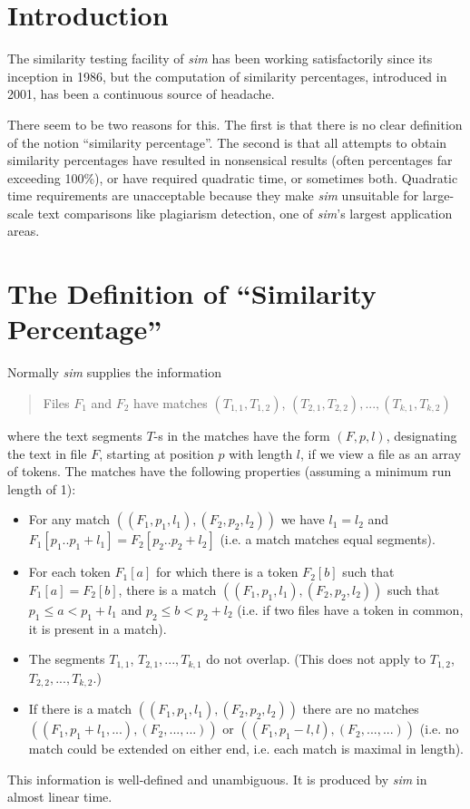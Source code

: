 \documentclass[a4paper,fleqn]{article}
\renewcommand{\sim}[0]{{\it sim}}
\begin{document}
\maketitle

\section{Introduction}

The similarity testing facility of {\sim} has been working satisfactorily
since its inception in 1986, but the computation of similarity percentages,
introduced in 2001, has been a continuous source of headache.

There seem to be two reasons for this. The first is that there is no clear
definition of the notion ``similarity percentage''.
The second is that all
attempts to obtain similarity percentages have resulted in nonsensical results
(often percentages far exceeding 100\%), or have required quadratic time, or
sometimes both. Quadratic time requirements are unacceptable because they
make {\sim} unsuitable for large-scale text comparisons like
plagiarism detection, one of {\sim}'s largest application areas.

\section{The Definition of ``Similarity Percentage''}

Normally {\sim} supplies the information
\begin{quote}
Files $F_1$ and $F_2$ have matches
$(T_{1,1}, T_{1,2})$, $(T_{2,1}, T_{2,2}), ..., (T_{k,1}, T_{k,2})$
\end{quote}
where the text segments $T$-s in the matches have the form $(F, p, l)$,
designating the text in file $F$, starting at position $p$ with length $l$,
if we view a file as an array of tokens.
The matches have the following properties (assuming a minimum run length of 1):
\begin{itemize}
\item
For any match $((F_1, p_1, l_1), (F_2, p_2, l_2))$ we have $l_1 = l_2$ and
$F_1[p_1..p_1+l_1] = F_2[p_2..p_2+l_2]$ (i.e. a match matches equal segments).
\item
For each token $F_1[a]$ for which there is a token $F_2[b]$ such that
$F_1[a]=F_2[b]$, there is a match $((F_1, p_1, l_1), (F_2, p_2, l_2))$ such
that $p_1 \leq a < p_1+l_1$ and $p_2 \leq b < p_2+l_2$
(i.e. if two files have a token in common, it is present in a match).
\item
The segments $T_{1,1}$, $T_{2,1}, ..., T_{k,1}$ do not overlap. (This does not
apply to $T_{1,2}$, $T_{2,2}, ..., T_{k,2}$.)
\item
If there is a match $((F_1, p_1, l_1), (F_2, p_2, l_2))$ there are no matches
$((F_1, p_1 + l_1, ...), (F_2, ..., ...))$ or
$((F_1, p_1-l, l), (F_2, ..., ...))$ (i.e. no match could be extended on either
end, i.e. each match is maximal in length).
\end{itemize}
This information is well-defined and unambiguous.
It is produced by {\sim} in almost linear time.
\end{document}
